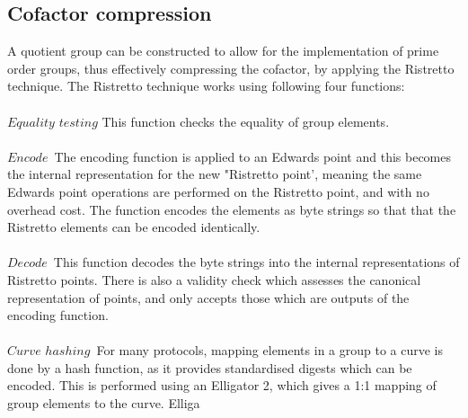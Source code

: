 \documentclass{article}
\begin{document}
\subsection{Cofactor compression}
A quotient group can be constructed to allow for the implementation of prime order groups, thus effectively compressing the cofactor, by applying the Ristretto technique. The Ristretto technique works using following four functions:\\\\   
${Equality}$ ${testing}$ This function checks the equality of group elements. \\\\
${Encode}$\ The encoding function is applied to an Edwards point and this becomes the internal representation for the new "Ristretto point', meaning the same Edwards point operations are performed on the Ristretto point, and with no overhead cost. The function encodes the elements as byte strings so that that the Ristretto elements can be encoded identically.\\\\
${Decode}$\ This function decodes the byte strings into the internal representations of Ristretto points. There is also a validity check which assesses the canonical representation of points, and only accepts those which are outputs of the encoding function. \\\\
${Curve}$ ${hashing}$\ For many protocols, mapping elements in a group to a curve is done by a hash function, as it provides standardised digests which can be encoded. This is performed using an Elligator 2, which gives a 1:1 mapping of group elements to the curve. Elliga
 
\end{document}
